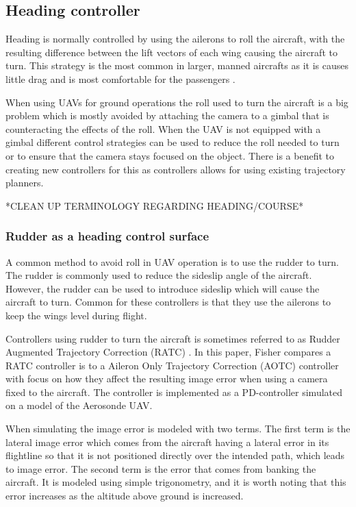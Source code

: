 \subsection{Heading controller}
Heading is normally controlled by using the ailerons to roll the aircraft, with the resulting difference between the lift vectors of each wing causing the aircraft to turn. This strategy is the most common in larger, manned aircrafts as it is causes little drag and is most comfortable for the passengers \cite{skidToTurnMills}.

When using UAVs for ground operations the roll used to turn the aircraft is a big problem which is mostly avoided by attaching the camera to a gimbal that is counteracting the effects of the roll. When the UAV is not equipped with a gimbal different control strategies can be used to reduce the roll needed to turn or to ensure that the camera stays focused on the object. There is a benefit to creating new controllers for this as controllers allows for using existing trajectory planners.

*CLEAN UP TERMINOLOGY REGARDING HEADING/COURSE*

\subsubsection{Rudder as a heading control surface}
A common method to avoid roll in UAV operation is to use the rudder to turn. The rudder is commonly used to reduce the sideslip angle of the aircraft. However, the rudder can be used to introduce sideslip which will cause the aircraft to turn. Common for these controllers is that they use the ailerons to keep the wings level during flight.

Controllers using rudder to turn the aircraft is sometimes referred to as Rudder Augmented Trajectory Correction (RATC) \cite{ratcFISHER}. In this paper, Fisher compares a RATC controller is to a Aileron Only Trajectory Correction (AOTC) controller with focus on how they affect the resulting image error when using a camera fixed to the aircraft. The controller is implemented as a PD-controller simulated on a model of the Aerosonde UAV.

When simulating the image error is modeled with two terms. The first term is the lateral image error which comes from the aircraft having a lateral error in its flightline so that it is not positioned directly over the intended path, which leads to image error. The second term is the error that comes from banking the aircraft. It is modeled using simple trigonometry, and it is worth noting that this error increases as the altitude above ground is increased.

